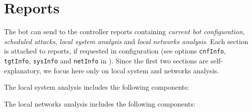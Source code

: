 \section{Reports}
\label{sec:reports}

The bot can send to the controller reports containing \textit{current bot configuration}, \textit{scheduled attacks}, \textit{local system analysis} and \textit{local networks analysis}. Each section is attached to reports, if requested in configuration (see options \texttt{cnfInfo}, \texttt{tgtInfo}, \texttt{sysInfo} and \texttt{netInfo} in ). Since the first two sections are self-explanatory, we focus here only on local system and networks analysis.

The local system analysis includes the following components:

\begin{description}
  \setlength\itemsep{1em}
  \item[SYSTEM-ITEM-1] \textcolor{green}{\lipsum[1]}
\end{description}

The local networks analysis includes the following components:

\begin{description}
  \setlength\itemsep{1em}
  \item[NETWORK-ITEM-1] \textcolor{green}{\lipsum[1]}
\end{description}
